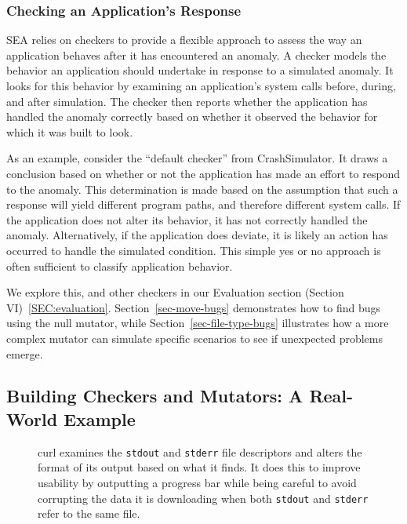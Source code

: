 \subsubsection{Checking an Application's Response}
\label{SUBSUB:CheckingResponse}
SEA relies on checkers
to provide a flexible approach to assess the way an application
behaves after it has encountered an anomaly.
A checker models
the behavior an application should undertake
in response to a simulated anomaly.
It looks for this behavior by examining an application's system calls
before, during, and after simulation.
The checker then reports whether the application has handled
the anomaly correctly
based on whether it observed the behavior for which it was built to look.

As an example, consider the ``default checker'' from CrashSimulator.
It draws a conclusion based on
whether or not the application
has made an effort to respond
to the anomaly.
This determination is made based
on the assumption
that such a response will yield
different program paths, and therefore different system calls.
If the application
does not alter its behavior, it has not
correctly handled the anomaly.
Alternatively,
if the application does deviate,
it is likely
an action has occurred to handle the simulated condition.
This simple yes or no approach
is often sufficient
to classify application behavior.

We explore this, and other checkers in our
Evaluation section (Section VI)~\ref{SEC:evaluation}.
Section~\ref{sec-move-bugs} demonstrates how to find bugs using the null
mutator, while Section~\ref{sec-file-type-bugs}
illustrates how a more complex
mutator can simulate specific scenarios to see if unexpected problems
emerge.

\subsection{Building Checkers and Mutators: A Real-World Example}
\label{SUBSEC:Example}

\begin{figure}[t]
  \center{}
  \caption{curl examines the {\tt stdout} and {\tt stderr} file descriptors
  and alters the format of its output based on what it finds.  It does this
  to improve usability by outputting a progress bar while being careful to
  avoid corrupting the data it is downloading when both {\tt stdout} and
  {\tt stderr} refer to the same file.}
  \label{figure:curlflow}
\end{figure}


